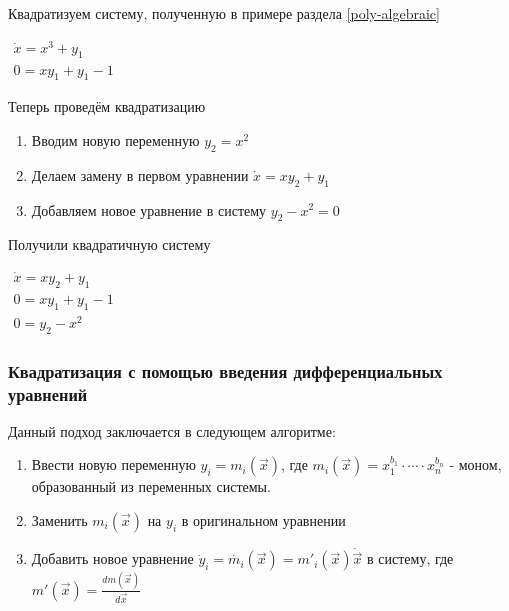 \begin{example}
    Квадратизуем систему, полученную в примере раздела \ref{poly-algebraic}

    $\begin{array}{lcl}
        \dot x = x^3 + y_1 \\
        0 = xy_1 + y_1 - 1
    \end{array}$
    \newline
    
    Теперь проведём квадратизацию
    
    \begin{enumerate}
    	\item Вводим новую переменную $y_2 =  x^2$
    	\item Делаем замену в первом уравнении $\dot x = xy_2 + y_1$
    	\item Добавляем новое уравнение в систему $y_2 - x^2 = 0$
    \end{enumerate}
    
    Получили квадратичную систему
    
    $\begin{array}{lcl}
        \dot x = xy_2 + y_1 \\
        0 = xy_1 + y_1 - 1 \\
        0 = y_2 - x^2
    \end{array}$
\end{example}


\subsubsection{Квадратизация с помощью введения дифференциальных уравнений}

Данный подход заключается в следующем алгоритме:
\begin{enumerate}
    \item Ввести новую переменную $y_i = m_i(\vec x)$, где $m_i(\vec x) = x_1^{b_1}\cdot \cdots \cdot x_n^{b_n}$ - моном, образованный из переменных системы.
    \item Заменить $m_i(\vec x)$ на $y_i$ в оригинальном уравнении
    \item Добавить новое уравнение $\dot y_i = \dot {m_i}(\vec x) = m'_i(\vec x) \dot{\vec x}$ в систему, где $m'(\vec x) = \frac {dm(\vec x)}{d \vec x}$
\end{enumerate}

